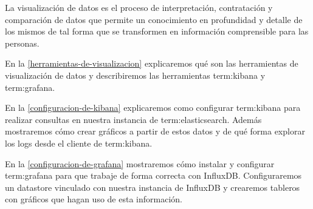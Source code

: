 La visualización de datos es el proceso de interpretación, contratación y
comparación de datos que permite un conocimiento en profundidad y detalle de
los mismos de tal forma que se transformen en información comprensible para las
personas.

En la \autoref{herramientas-de-visualizacion} explicaremos qué son las
herramientas de visualización de datos y describiremos las herramientas
\gls{term:kibana} y \gls{term:grafana}.

En la \autoref{configuracion-de-kibana} explicaremos como configurar
\gls{term:kibana} para realizar consultas en nuestra instancia de
\gls{term:elasticsearch}. Además mostraremos cómo crear gráficos a partir de
estos datos y de qué forma explorar los logs desde el cliente  de
\gls{term:kibana}.

En la \autoref{configuracion-de-grafana} mostraremos cómo instalar y configurar
\gls{term:grafana} para que trabaje de forma correcta con InfluxDB.
Configuraremos un datastore vinculado con nuestra instancia de InfluxDB y
crearemos tableros con gráficos que hagan uso de esta información.

